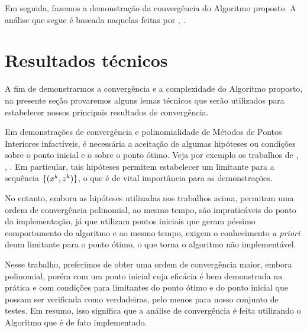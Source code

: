 Em seguida, fazemos a demonstração da convergência do Algoritmo proposto. A análise que segue é  baseada naquelas feitas por \textcite[cap. 6]{Wright:Primal-dual-interior-point:1997h},  \textcite{Zhang:2006ic,Zhang:1995fu}. 



\section{Resultados técnicos}



A fim de demonstrarmos a convergência e a complexidade do Algoritmo proposto, na presente seção provaremos alguns lemas técnicos que serão utilizados para estabelecer nossos principais resultados de convergência. 




Em demonstrações de convergência e polinomialidade de Métodos de Pontos Interiores  infactíveis, é  necessária a aceitação de algumas hipóteses ou condições sobre o ponto inicial e o sobre o ponto ótimo. Veja por exemplo os trabalhos de \textcite{Wright:1994jd}, \textcite[cap. 6]{Wright:Primal-dual-interior-point:1997h}, \textcite{Wright:1996kj,Zhang:2006ic,Zhang:1994fz,Zhang:1995fu}. Em particular, tais hipóteses permitem estabelecer um limitante para a sequência $\{(x^{k},z^{k})\}$, o que é de vital importância para as demonstrações.

No entanto, embora as hipóteses utilizadas nos trabalhos acima, permitam uma ordem de convergência  polinomial, ao mesmo tempo, são impraticáveis do ponto da implementação, já que utilizam pontos iniciais que geram péssimo comportamento do algoritmo e ao mesmo tempo, exigem o conhecimento \emph{a priori}  deum limitante para o ponto ótimo, o que torna o algoritmo não implementável. 

Nesse trabalho, preferimos de obter uma ordem de convergência maior, embora polinomial, porém com um ponto inicial cuja eficácia é bem demonstrada na prática e com  condições para limitantes  do ponto ótimo e do ponto inicial que possam ser verificada como verdadeiras, pelo menos para nosso conjunto de testes. Em resumo, isso significa que a análise de convergência é feita utilizando o Algoritmo que é de fato implementado.



